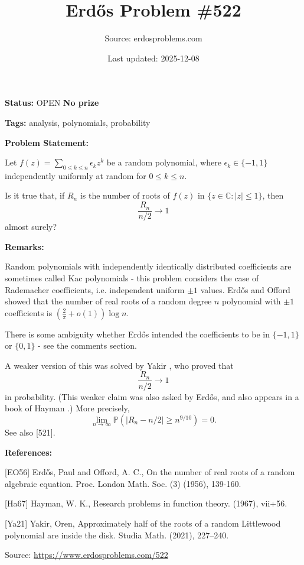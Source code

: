 \documentclass{article}
\title{Erd\H{o}s Problem \#522}
\date{Last updated: 2025-12-08}
\author{Source: erdosproblems.com}
\begin{document}
\maketitle

\noindent\textbf{Status:} OPEN \quad \textbf{No prize}

\noindent\textbf{Tags:} analysis, polynomials, probability

\medskip
\noindent\textbf{Problem Statement:}

Let $f(z)=\sum_{0\leq k\leq n} \epsilon_k z^k$ be a random polynomial, where $\epsilon_k\in \{-1,1\}$ independently uniformly at random for $0\leq k\leq n$. 

Is it true that, if $R_n$ is the number of roots of $f(z)$ in $\{ z\in \mathbb{C} : \lvert z\rvert \leq 1\}$, then\[\frac{R_n}{n/2}\to 1\]almost surely?

\bigskip
\noindent\textbf{Remarks:}

Random polynomials with independently identically distributed coefficients are sometimes called Kac polynomials - this problem considers the case of Rademacher coefficients, i.e. independent uniform $\pm 1$ values. Erd\H{o}s and Offord \cite{EO56} showed that the number of real roots of a random degree $n$ polynomial with $\pm 1$ coefficients is $(\frac{2}{\pi}+o(1))\log n$.

There is some ambiguity whether Erd\H{o}s intended the coefficients to be in $\{-1,1\}$ or $\{0,1\}$ - see the comments section.

A weaker version of this was solved by Yakir \cite{Ya21}, who proved that\[\frac{R_n}{n/2}\to 1\]in probability. (This weaker claim was also asked by Erd\H{o}s, and also appears in a book of Hayman \cite{Ha67}.) More precisely,\[\lim_{n\to \infty} \mathbb{P}(\lvert R_n-n/2\rvert \geq n^{9/10}) =0.\]See also [521].

\bigskip
\noindent\textbf{References:}

[EO56] Erd\H{o}s, Paul and Offord, A. C., On the number of real roots of a random algebraic equation. Proc. London Math. Soc. (3) (1956), 139-160.
 
 [Ha67] Hayman, W. K., Research problems in function theory. (1967), vii+56.
 
 [Ya21] Yakir, Oren, Approximately half of the roots of a random {L}ittlewood
polynomial are inside the disk. Studia Math. (2021), 227--240.

\bigskip
\noindent\small{Source: \url{https://www.erdosproblems.com/522}}
\end{document}
